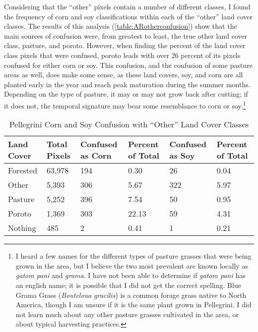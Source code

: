 Considering that the ``other'' pixels contain a number of different classes, I found the frequency of corn and soy classifications within each of the ``other'' land cover classes. The results of this analysis (\autoref{table:ARotherconfusion}) show that the main sources of confusion were, from greatest to least, the true other land cover class, pasture, and poroto. However, when finding the percent of the land cover class pixels that were confused, poroto leads with over 26 percent of its pixels confused for either corn or soy. This confusion, and the confusion of some pasture areas as well, does make some sense, as these land covers, soy, and corn are all planted early in the year and reach peak maturation during the summer months. Depending on the type of pasture, it may or may not grow back after cutting; if it does not, the temporal signature may bear some resemblance to corn or soy.\footnote{I heard a few names for the different types of pasture grasses that were being grown in the area, but I believe the two most prevalent are known locally as \textit{\textspanish{gatom pani}} and \textit{\textspanish{grama}}. I have not been able to determine if \textit{\textspanish{gatom pani}} has an english name; it is possible that I did not get the correct spelling. Blue Grama Grass (\textit{Bouteloua gracilis}) is a common forage grass native to North America, though I am unsure if it is the same plant grown in Pellegrini. I did not learn much about any other pasture grasses cultivated in the area, or about typical harvesting practices.}

\begin{table}[b]
  \begin{Spacing}{1.0}
  \centering
  \caption{Pellegrini Corn and Soy Confusion with ``Other'' Land Cover Classes}
  \label{table:ARotherconfusion}
  \begin{tabu}{X[0.6,m,c]X[0.5,m,c]|X[1,m,c]X[0.55,m,c]|X[1,m,c]X[0.55,m,c]}
    \toprule
    \textbf{Land Cover} & \textbf{Total Pixels} & \textbf{Confused as Corn} & \textbf{Percent of Total} & \textbf{Confused as Soy} & \textbf{Percent of Total} \\
    \midrule
    Forested & 63,978 & 194 & 0.30 & 26 & 0.04 \\
    Other & 5,393 & 306 & 5.67 & 322 & 5.97 \\
    Pasture & 5,252 & 396 & 7.54 & 50 & 0.95 \\
    Poroto & 1,369 & 303 & 22.13 & 59 & 4.31 \\
    Nothing & 485 & 2 & 0.41 & 1 & 0.21 \\
    \bottomrule
  \end{tabu}
  \end{Spacing}
\end{table}

